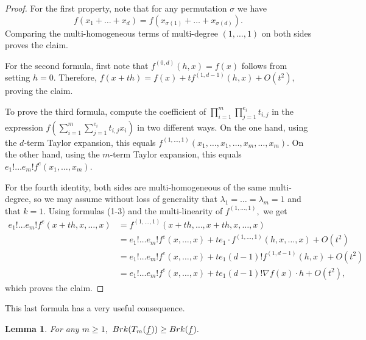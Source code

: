 \documentclass[10pt,a4paper]{amsart}
\let\ul\underline
\newtheorem{lemma}[theorem]{Lemma}
\theoremstyle{definition}
\newcommand{\brk}{\textnormal{Brk}}
\begin{document}
\begin{proof}
    For the first property, note that for any permutation $\sigma$ we have 
    $$f(x_1+\ldots+x_d) = f(x_{\sigma(1)}+\ldots+x_{\sigma(d)}).$$
    Comparing the multi-homogeneous terms of multi-degree $(1,\ldots,1)$ on both sides proves the claim.

    For the second formula, first note that $f^{(0,d)}(h,x) = f(x)$ follows from setting $h=0.$ Therefore, $f(x+th) = f(x) + t f^{(1,d-1)}(h,x) +O(t^2),$ proving the claim. 

    To prove the third formula, compute the coefficient of $\prod_{i=1}^m \prod_{j=1}^{e_i} t_{i,j}$ in the expression $f\left (\sum_{i=1}^m \sum_{j=1}^{e_i}  t_{i,j} x_i \right)$ in two different ways. On the one hand, using the $d$-term Taylor expansion, this equals $f^{(1,\ldots,1)} (x_1,\ldots,x_1,\ldots,x_m,\ldots,x_m).$ On the other hand, using the $m$-term Taylor expansion, this equals $e_1!\ldots e_m! f^e(x_1,\ldots,x_m).$

     For the fourth identity, both sides are multi-homogeneous of the same multi-degree, so we may assume without loss of generality that $\lambda_1 = \ldots = \lambda_m = 1$ and that $k=1.$ Using formulas (1-3) and the multi-linearity of $f^{(1,\ldots,1)},$ we get
    \begin{align*}
        e_1!\ldots e_m! f^e(x+th,x,\ldots,x) &= f^{(1,\ldots,1)}(x+th,\ldots,x+th,x,\ldots,x) \\
        &= e_1!\ldots e_m! f^e(x,\ldots,x) + t e_1\cdot f^{(1,\ldots,1)}(h,x,\ldots,x) + O(t^2) \\
        &= e_1!\ldots e_m! f^e(x,\ldots,x) + t e_1(d-1)! f^{(1,d-1)} (h,x) + O(t^2) \\
        &= e_1!\ldots e_m! f^e(x,\ldots,x) + t e_1(d-1)! \nabla f(x)\cdot h + O(t^2),
    \end{align*}
    which proves the claim.
\end{proof}


This last formula has a very useful consequence.

\begin{lemma}\label{lem:brk-taylor}
    For any $m\ge 1,$ $\brk(T_m(\ul{f})) \ge \brk(\ul{f}).$ 
\end{lemma}
\end{document}
